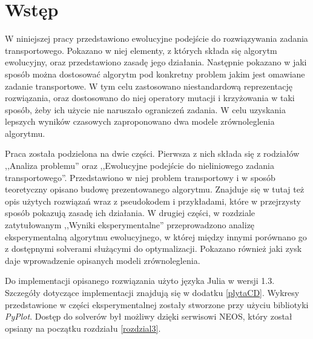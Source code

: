 \chapter{Wstęp}
\thispagestyle{chapterBeginStyle}

W niniejszej pracy przedstawiono ewolucyjne podejście do rozwiązywania zadania transportowego. Pokazano w niej elementy, z których składa się algorytm 
ewolucyjny, oraz przedstawiono zasadę jego działania. Następnie pokazano w jaki sposób można dostosować algorytm pod konkretny problem jakim 
jest omawiane zadanie transportowe. W tym celu zastosowano niestandardową reprezentację rozwiązania, oraz dostosowano do niej operatory mutacji 
i krzyżowania w taki sposób, żeby ich użycie nie naruszało ograniczeń zadania. W celu uzyskania lepszych wyników czasowych zaproponowano dwa 
modele zrównoleglenia algorytmu. 

Praca została podzielona na dwie części. Pierwsza z nich składa się z rodziałów ,,Analiza problemu'' oraz 
,,Ewolucyjne podejście do nieliniowego zadania transportowego''. Przedstawiono w niej problem transportowy i w sposób teoretyczny opisano budowę 
prezentowanego algorytmu. 
Znajduje się w tutaj też opis użytych rozwiązań wraz z pseudokodem i przykładami, które w przejrzysty sposób pokazują zasadę ich działania. 
W drugiej części, w rozdziale zatytułowanym ,,Wyniki eksperymentalne'' przeprowadzono analizę eksperymentalną algorytmu ewolucyjnego, w której między 
innymi porównano go z dostępnymi solverami służącymi do optymalizacji. Pokazano również jaki zysk daje wprowadzenie opisanych modeli zrównoleglenia. 

Do implementacji opisanego rozwiązania użyto języka Julia w wersji 1.3. Szczegóły dotyczące implementacji znajdują się w dodatku \ref{plytaCD}. 
Wykresy przedstawione w części eksperymentalnej zostały stworzone przy użyciu bibliotyki \textit{PyPlot}. Dostęp do solverów był możliwy dzięki 
serwisowi NEOS, który został opsiany na początku rozdziału \ref{rozdzial3}.